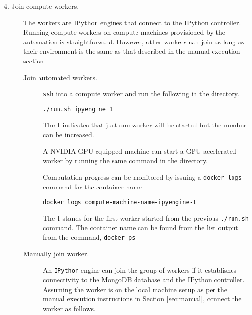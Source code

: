 \begin{description}
\begin{description}
\end{description}


\item[4. Join compute workers.] \hfill

The workers are \textsf{IPython} engines that connect to the \textsf{IPython} controller.
%
Running compute workers on compute machines provisioned by the automation is straightforward. 
%
However, other workers can join as long as their environment is the same as that described in the manual execution section.

\begin{description}


\item[Join automated workers.] \hfill

  \texttt{ssh} into a compute worker and run the following in the  directory.

\begin{verbatim}
./run.sh ipyengine 1
\end{verbatim}

%
The 1 indicates that just one worker will be started but the number can be increased.


A NVIDIA GPU-equipped machine can start a GPU accelerated worker by running the same command in the  directory.


Computation progress can be monitored by issuing a \texttt{docker logs} command for the container name.

\begin{verbatim}
docker logs compute-machine-name-ipyengine-1
\end{verbatim}

The 1 stands for the first worker started from the previous \texttt{./run.sh} command.
%
The container name can be found from the list output from the command, \texttt{docker ps}.

\item[Manually join worker.] \hfill

An \texttt{IPython} engine can join the group of workers if it establishes connectivity to the \textsf{MongoDB} database and the \textsf{IPython} controller.
%
Assuming the worker is on the local machine setup as per the manual execution instructions in Section \ref{sec:manual}, connect the worker as follows.

\begin{description}[style=unboxed]



\end{description}
\end{description}
\end{description}

